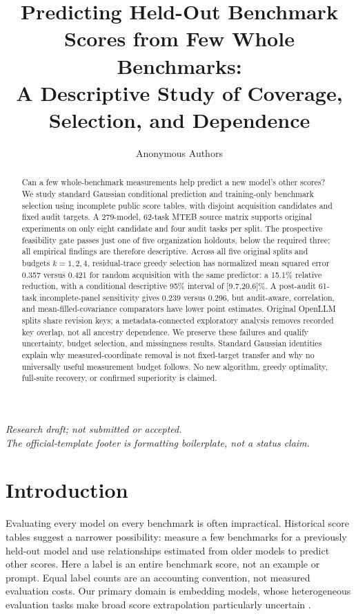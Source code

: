 \documentclass{article}
\title{Predicting Held-Out Benchmark Scores from Few Whole Benchmarks:\\A Descriptive Study of Coverage, Selection, and Dependence}
\author{Anonymous Authors}
\begin{document}
\maketitle
\begin{center}
\emph{Research draft; not submitted or accepted.\\The official-template footer is formatting boilerplate, not a status claim.}
\end{center}

\begin{abstract}
Can a few whole-benchmark measurements help predict a new model's other scores? We study standard Gaussian conditional prediction and training-only benchmark selection using incomplete public score tables, with disjoint acquisition candidates and fixed audit targets. A 279-model, 62-task MTEB source matrix supports original experiments on only eight candidate and four audit tasks per split. The prospective feasibility gate passes just one of five organization holdouts, below the required three; all empirical findings are therefore descriptive. Across all five original splits and budgets $k=1,2,4$, residual-trace greedy selection has normalized mean squared error 0.357 versus 0.421 for random acquisition with the same predictor: a 15.1\% relative reduction, with a conditional descriptive 95\% interval of [9.7,20.6]\%. A post-audit 61-task incomplete-panel sensitivity gives 0.239 versus 0.296, but audit-aware, correlation, and mean-filled-covariance comparators have lower point estimates. Original OpenLLM splits share revision keys; a metadata-connected exploratory analysis removes recorded key overlap, not all ancestry dependence. We preserve these failures and qualify uncertainty, budget selection, and missingness results. Standard Gaussian identities explain why measured-coordinate removal is not fixed-target transfer and why no universally useful measurement budget follows. No new algorithm, greedy optimality, full-suite recovery, or confirmed superiority is claimed.
\end{abstract}

\section{Introduction}\label{sec:intro}
Evaluating every model on every benchmark is often impractical. Historical score tables suggest a narrower possibility: measure a few benchmarks for a previously held-out model and use relationships estimated from older models to predict other scores. Here a label is an entire benchmark score, not an example or prompt. Equal label counts are an accounting convention, not measured evaluation costs. Our primary domain is embedding models, whose heterogeneous evaluation tasks make broad score extrapolation particularly uncertain \citep{muennighoff2022mteb}.
\end{document}
